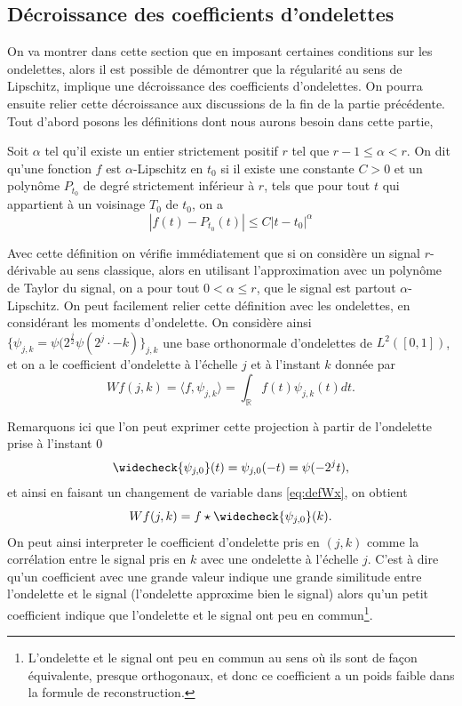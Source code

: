 \subsection{Décroissance des coefficients d'ondelettes}
On va montrer dans cette section que en imposant certaines conditions sur les ondelettes, alors il est possible de démontrer que la régularité au sens de Lipschitz, implique une décroissance des coefficients d'ondelettes.
On pourra ensuite relier cette décroissance aux discussions de la fin de la partie précédente.
\newline
Tout d'abord posons les définitions dont nous aurons besoin dans cette partie,
\begin{definition}
	Soit $\alpha$ tel qu'il existe un entier strictement positif $r$ tel que $r-1 \leq \alpha <r$. On dit qu'une fonction $f$ est $\alpha$-Lipschitz en $t_0$ si il existe une constante $C>0$ et un polynôme $P_{t_0}$ de degré strictement inférieur à $r$, tels que pour tout $t$ qui appartient à un voisinage $T_0$ de $t_0$, on a 
	\begin{equation*}
		|f(t) - P_{t_0}(t)| \leq C|t-t_0|^{\alpha}
	\end{equation*}
\end{definition}
Avec cette définition on vérifie immédiatement que si on considère un signal $r$-dérivable au sens classique, alors en utilisant l'approximation avec un polynôme de Taylor du signal, on a pour tout $0 < \alpha \leq r$, que le signal est partout $\alpha$-Lipschitz.
\newline
On peut facilement relier cette définition avec les ondelettes, en considérant les moments d'ondelette.
On considère ainsi $\{\psi_{j, k} = \psi( 2^{\frac{j}{2}}\psi(2^j\cdot -k)\}_{j,k}$ une base orthonormale d'ondelettes de $L^2([0, 1])$, et on a le coefficient d'ondelette à l'échelle $j$ et à l'instant $k$ donnée par
\begin{equation*}\label{eq:defWx}
	Wf (j, k) = \langle f, \psi_{j,k} \rangle = \int_\mathbb{R} f(t) \psi_{j,k}(t)dt.
\end{equation*}
\begin{remarque}
Remarquons ici que l'on peut exprimer cette projection à partir de l'ondelette prise à l'instant $0$
\begin{equation*}
	\widecheck{\psi_{j,0}}(t) = \psi_{j, 0}(-t) = \psi(-2^jt),
\end{equation*}
et ainsi en faisant un changement de variable dans \ref{eq:defWx}, on obtient
\begin{equation}
	Wf(j,k) = f \star \widecheck{\psi_{j,0}}(k).
\end{equation}
On peut ainsi interpreter le coefficient d'ondelette pris en $(j,k)$ comme la corrélation entre le signal pris en $k$ avec une ondelette à l'échelle $j$.
C'est à dire qu'un coefficient avec une grande valeur indique une grande similitude entre l'ondelette et le signal (l'ondelette approxime bien le signal) alors qu'un petit coefficient indique que l'ondelette et le signal ont peu en commun\footnote{L'ondelette et le signal ont peu en commun au sens où ils sont de façon équivalente, presque orthogonaux, et donc ce coefficient a un poids faible dans la formule de reconstruction.}.
\end{remarque}
